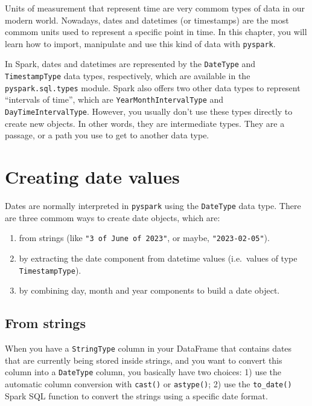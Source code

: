 \documentclass[
  11pt,
  letterpaper,
  DIV=11,
  numbers=noendperiod]{scrreprt}
\providecommand{\tightlist}{%
  \setlength{\itemsep}{0pt}\setlength{\parskip}{0pt}}\usepackage{longtable,booktabs,array}
\begin{document}
Units of measurement that represent time are very commom types of data
in our modern world. Nowadays, dates and datetimes (or timestamps) are
the most commom units used to represent a specific point in time. In
this chapter, you will learn how to import, manipulate and use this kind
of data with \texttt{pyspark}.

In Spark, dates and datetimes are represented by the \texttt{DateType}
and \texttt{TimestampType} data types, respectively, which are available
in the \texttt{pyspark.sql.types} module. Spark also offers two other
data types to represent ``intervals of time'', which are
\texttt{YearMonthIntervalType} and \texttt{DayTimeIntervalType}.
However, you usually don't use these types directly to create new
objects. In other words, they are intermediate types. They are a
passage, or a path you use to get to another data type.

\hypertarget{sec-create-dates}{%
\section{Creating date values}\label{sec-create-dates}}

Dates are normally interpreted in \texttt{pyspark} using the
\texttt{DateType} data type. There are three commom ways to create date
objects, which are:

\begin{enumerate}
\def\labelenumi{\arabic{enumi}.}
\tightlist
\item
  from strings (like \texttt{"3\ of\ June\ of\ 2023"}, or maybe,
  \texttt{"2023-02-05"}).
\item
  by extracting the date component from datetime values (i.e.~values of
  type \texttt{TimestampType}).
\item
  by combining day, month and year components to build a date object.
\end{enumerate}

\hypertarget{from-strings}{%
\subsection{From strings}\label{from-strings}}

When you have a \texttt{StringType} column in your DataFrame that
contains dates that are currently being stored inside strings, and you
want to convert this column into a \texttt{DateType} column, you
basically have two choices: 1) use the automatic column conversion with
\texttt{cast()} or \texttt{astype()}; 2) use the \texttt{to\_date()}
Spark SQL function to convert the strings using a specific date format.
\end{document}
